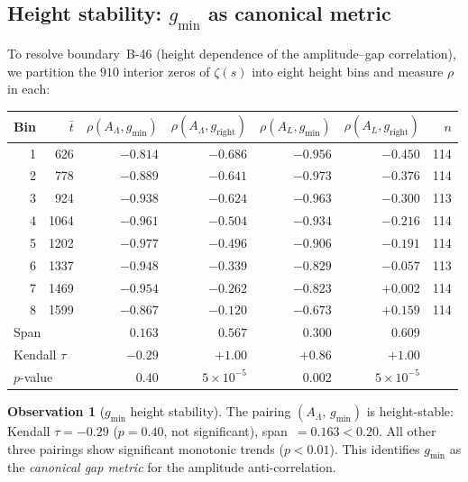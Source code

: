 \documentclass[11pt,a4paper]{article}
\theoremstyle{plain}
\theoremstyle{definition}
\newtheorem{observation}[theorem]{Observation}
\newcommand{\La}{\Lambda}
\begin{document}
\subsection{Height stability: $g_{\min}$ as canonical metric}
\label{subsec:height_stability}

To resolve boundary~B-46 (height dependence of the
amplitude--gap correlation), we partition the $910$ interior zeros
of $\zeta(s)$ into eight height bins and measure $\rho$ in each:

\begin{center}
\begin{tabular}{rrrrrrr}
\toprule
Bin & $\bar{t}$ & $\rho(A_\La, g_{\min})$ &
$\rho(A_\La, g_{\mathrm{right}})$ &
$\rho(A_L, g_{\min})$ &
$\rho(A_L, g_{\mathrm{right}})$ & $n$ \\
\midrule
1 & 626  & $-0.814$ & $-0.686$ & $-0.956$ & $-0.450$ & 114 \\
2 & 778  & $-0.889$ & $-0.641$ & $-0.973$ & $-0.376$ & 114 \\
3 & 924  & $-0.938$ & $-0.624$ & $-0.963$ & $-0.300$ & 113 \\
4 & 1064 & $-0.961$ & $-0.504$ & $-0.934$ & $-0.216$ & 114 \\
5 & 1202 & $-0.977$ & $-0.496$ & $-0.906$ & $-0.191$ & 114 \\
6 & 1337 & $-0.948$ & $-0.339$ & $-0.829$ & $-0.057$ & 113 \\
7 & 1469 & $-0.954$ & $-0.262$ & $-0.823$ & $+0.002$ & 114 \\
8 & 1599 & $-0.867$ & $-0.120$ & $-0.673$ & $+0.159$ & 114 \\
\midrule
\multicolumn{2}{l}{Span} & $0.163$ & $0.567$ & $0.300$ & $0.609$ & \\
\multicolumn{2}{l}{Kendall $\tau$} & $-0.29$ & $+1.00$ & $+0.86$ & $+1.00$ & \\
\multicolumn{2}{l}{$p$-value} & $0.40$ & $5\!\times\!10^{-5}$ & $0.002$ & $5\!\times\!10^{-5}$ & \\
\bottomrule
\end{tabular}
\end{center}

\begin{observation}[$g_{\min}$ height stability]\label{obs:stability}
The pairing $(\!A_\La,\, g_{\min}\!)$ is height-stable:
Kendall $\tau = -0.29$ ($p = 0.40$, not significant),
span~$= 0.163 < 0.20$.
All other three pairings show significant monotonic trends
($p < 0.01$).  This identifies $g_{\min}$ as the
\emph{canonical gap metric} for the amplitude anti-correlation.
\end{observation}
\end{document}
